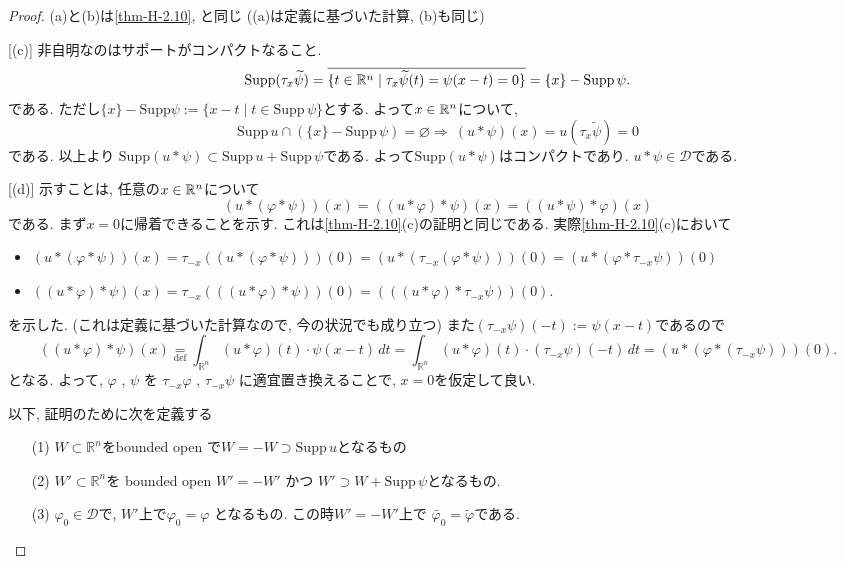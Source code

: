 \begin{proof}

(a)と(b)は\ref{thm-H-2.10}, \cite[Theorem 6.30]{Rud}と同じ
((a)は定義に基づいた計算, (b)も同じ)

[(c)]
非自明なのはサポートがコンパクトなること.
 \[
 \mathrm{Supp}(\tau_x \widetilde{\psi}) 
 = \overline{ \{ t \in \mathbb{R}^n \mid \tau_x \widetilde{\psi}(t)=\psi(x-t)=0\}} =
 \{x\} - \mathrm{Supp}\, \psi.
 \]
である. 
ただし$ \{x\} - \mathrm{Supp}\psi:= \{ x - t \mid t\in \mathrm{Supp}\,\psi\}$とする. 
よって$x \in \mathbb{R}^n$について,
\[
 \mathrm{Supp}\, u \cap ( \{x\} - \mathrm{Supp}\, \psi) = \varnothing
 \Rightarrow 
\ (u \ast  \psi)(x) = u(\tau_x \widetilde{\psi}) = 0 
\]
である. 以上より
\( \mathrm{Supp}(u \ast  \psi) \subset \mathrm{Supp}\, u + \mathrm{Supp}\, \psi \)である.
よって$\mathrm{Supp}(u \ast  \psi) $はコンパクトであり. \( u \ast \psi \in \mathcal{D}\)である. 

[(d)]
示すことは, 任意の$x \in \mathbb{R}^n$について
\[(u \ast (\varphi \ast \psi))(x) = ((u \ast \varphi) \ast \psi )(x) = ((u \ast \psi) \ast \varphi)(x) \]
である. 
まず$x=0$に帰着できることを示す. 
これは\ref{thm-H-2.10}(c)の証明と同じである. 
実際\ref{thm-H-2.10}(c)において
\begin{itemize}
\item \((u \ast (\varphi \ast \psi))(x) 
= \tau_{-x}((u \ast (\varphi \ast \psi)))(0) 
= (u \ast (\tau_{-x}(\varphi \ast \psi)))(0)
= (u \ast (\varphi\ast \tau_{-x}\psi))(0) \)
\item \( ((u \ast \varphi) \ast \psi)(x) = \tau_{-x}(((u \ast \varphi) \ast \psi))(0) 
= (((u \ast \varphi) \ast \tau_{-x}\psi))(0).\)
\end{itemize}
を示した. (これは定義に基づいた計算なので, 今の状況でも成り立つ)
また$(\tau_{-x} \psi)(-t):=\psi(x - t)$であるので
\[
((u \ast \varphi) \ast \psi)(x)
\underset{\text{def}}{=} \int_{\mathbb{R}^n} (u \ast \varphi)(t) \cdot \psi(x - t)\, dt
= \int_{\mathbb{R}^n} (u \ast \varphi)(t)\cdot  (\tau_{-x} \psi)(-t)\, dt
= (u \ast (\varphi \ast (\tau_{-x} \psi)))(0).
\]
となる.
よって, \(\varphi\) , \(\psi\) を \(\tau_{-x} \varphi\) , \(\tau_{-x} \psi\) に適宜置き換えることで, 
 \(x = 0\)を仮定して良い.
 
以下, 証明のために次を定義する
\begin{itemize}
\item[(1)]  \(W \subset \mathbb{R}^n\)をbounded open で\(W = -W \supset \mathrm{Supp}\, u\)となるもの
\item[(2)]  \(W' \subset \mathbb{R}^n\)を bounded open \(W' = -W'\) かつ \(W' \supset W + \mathrm{Supp}\, \psi\)となるもの.
\item[(3)] \(\varphi_0 \in \mathcal{D}\)で,  \(W'\)上で\(\varphi_0 = \varphi\) となるもの. この時$W' = -W'$上で \(\widetilde{\varphi_0} = \widetilde{\varphi}\)である. 
\end{itemize}


\end{proof}

